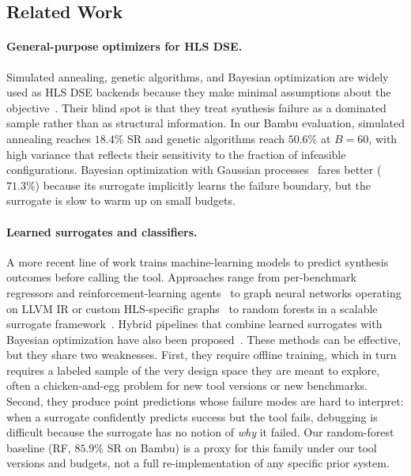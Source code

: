 \documentclass[journal]{IEEEtran}
\begin{document}
\subsection{Related Work}
\label{sec:related_work}

\paragraph{General-purpose optimizers for HLS DSE.}
Simulated annealing, genetic algorithms, and Bayesian optimization are widely used as HLS DSE backends because they make minimal assumptions about the objective~\cite{ferretti2020cluster,ferretti2018lattice,liu2013learning}. Their blind spot is that they treat synthesis failure as a dominated sample rather than as structural information. In our Bambu evaluation, simulated annealing reaches $18.4\%$ SR and genetic algorithms reach $50.6\%$ at $B{=}60$, with high variance that reflects their sensitivity to the fraction of infeasible configurations. Bayesian optimization with Gaussian processes~\cite{snoek2012practical} fares better ($71.3\%$) because its surrogate implicitly learns the failure boundary, but the surrogate is slow to warm up on small budgets.

\paragraph{Learned surrogates and classifiers.}
A more recent line of work trains machine-learning models to predict synthesis outcomes before calling the tool. Approaches range from per-benchmark regressors and reinforcement-learning agents~\cite{wu2021ironman} to graph neural networks operating on LLVM IR or custom HLS-specific graphs~\cite{sohrabizadeh2022automated,ustun2020learning,murphy2024balor} to random forests in a scalable surrogate framework~\cite{sohrabizadeh2023autoscaledse,liu2013learning}. Hybrid pipelines that combine learned surrogates with Bayesian optimization have also been proposed~\cite{kuang2023hgbo,koikeakino2024autohls}. These methods can be effective, but they share two weaknesses. First, they require offline training, which in turn requires a labeled sample of the very design space they are meant to explore, often a chicken-and-egg problem for new tool versions or new benchmarks. Second, they produce point predictions whose failure modes are hard to interpret: when a surrogate confidently predicts success but the tool fails, debugging is difficult because the surrogate has no notion of \emph{why} it failed. Our random-forest baseline (RF, $85.9\%$ SR on Bambu) is a proxy for this family under our tool versions and budgets, not a full re-implementation of any specific prior system.
\end{document}
